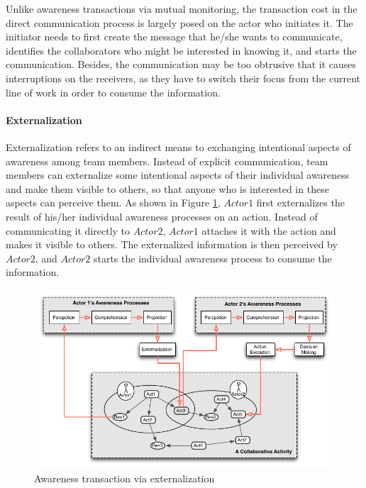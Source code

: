Unlike awareness transactions via mutual monitoring, the transaction cost in the direct communication process is largely posed on the actor who initiates it. The initiator needs to first create the message that he/she wants to communicate, identifies the collaborators who might be interested in knowing it, and starts the communication. Besides, the communication may be too obtrusive that it causes interruptions on the receivers, as they have to switch their focus from the current line of work in order to consume the information.

\paragraph*{Externalization} %
\label{par:externalization}
Externalization refers to an indirect means to exchanging intentional aspects of awareness among team members. Instead of explicit communication, team members can externalize some intentional aspects of their individual awareness and make them visible to others, so that anyone who is interested in these aspects can perceive them. As shown in Figure \ref{fig:trans_externalization}, $Actor1$ first externalizes the result of his/her individual awareness processes on an action. Instead of communicating it directly to $Actor2$, $Actor1$ attaches it with the action and makes it visible to others. The externalized information is then perceived by $Actor2$, and $Actor2$ starts the individual awareness process to consume the information.

\begin{figure}[htbp] %
   \centering
   \includegraphics{trans_externalization.pdf} 
   \caption{Awareness transaction via externalization}
   \label{fig:trans_externalization}
\end{figure}

